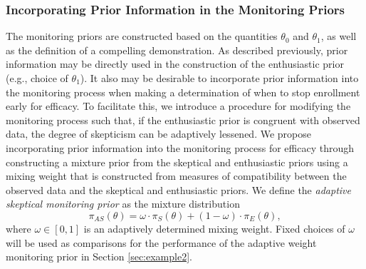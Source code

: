 \documentclass[AMA,STIX1COL,doublespace]{WileyNJD-v2}
\begin{document}
\subsubsection{Incorporating Prior Information in the Monitoring Priors}\label{sec:incorporating}
The monitoring priors are constructed based on the quantities $\theta_0$ and $\theta_1$, as well as the definition of a compelling demonstration. 
%
As described previously, prior information may be directly used in the construction of the enthusiastic prior (e.g., choice of $\theta_1$).
%
It also may be desirable to incorporate prior information into the monitoring process when making a determination of when to stop enrollment 
early for efficacy.
%
To facilitate this, we introduce a procedure for modifying the monitoring process such that, if the enthusiastic prior is congruent with observed data, the degree of skepticism can be adaptively lessened.
We propose incorporating prior information into the monitoring process for efficacy through constructing a mixture prior
from the skeptical and enthusiastic priors using a mixing weight that is constructed from measures of compatibility between the
observed data and the skeptical and enthusiastic priors. 
We define the \textit{adaptive skeptical monitoring prior} as the mixture distribution	
\begin{equation}\label{eq:inference_prior}
	\pi_{AS}\left(\theta\right)=\omega\cdot\pi_{S}\left(\theta\right)+(1-\omega) \cdot \pi_E\left(\theta\right),
\end{equation}
where $\omega\in[0,1]$ is an adaptively determined mixing weight. Fixed choices of $\omega$ will be used as comparisons for the performance of the adaptive weight monitoring prior in Section \ref{sec:example2}. 
\end{document}
